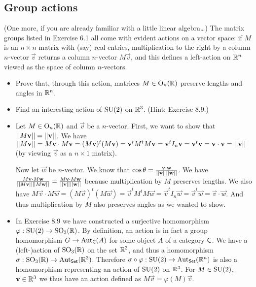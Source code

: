 \subsection{Group actions}

\begin{problem}
	(One more, if you are already familiar with a little linear algebra\dots) The matrix groups listed in Exercise 6.1 all come with evident actions on a vector space: if $M$ is an $n \times n$ matrix with (say) real entries, multiplication to the right by a column $n$-vector $\vec{v}$ returns a column $n$-vector $M \vec{v}$, and this defines a left-action on $\mathbb{R}^n$ viewed as the space of column $n$-vectors.
	\begin{itemize}
		\item Prove that, through this action, matrices $M \in \mathrm{O}_n(\mathbb{R})$ preserve lengths and angles in $\mathbb{R}^n$.
		\item Find an interesting action of $\mathrm{SU}(2)$ on $\mathbb{R}^3$. (Hint: Exercise 8.9.)
	\end{itemize}
\end{problem}

\begin{solution}
	\begin{itemize}
		\item Let $M \in \mathrm{O}_n(\mathbb{R})$ and $\vec{v}$ be a $n$-vector. First, we want to show that $\left|\left|M \mathbf{v}\right|\right| = \left|\left|\mathbf{v}\right|\right|$. We have $\left|\left|M \mathbf{v}\right|\right| = M \mathbf{v} \cdot M \mathbf{v} = (M \mathbf{v})^t (M \mathbf{v}) = \mathbf{v}^t M^t M \mathbf{v} = \mathbf{v}^t I_n \mathbf{v} = \mathbf{v}^t \mathbf{v} = \mathbf{v} \cdot \mathbf{v} = \left|\left|\mathbf{v}\right|\right|$ (by viewing $\vec{v}$ as a $n \times 1$ matrix).
		
		Now let $\vec{w}$ be $n$-vector. We know that $\cos \theta = \frac{\mathbf{v} \cdot \mathbf{w}}{\left|\left|\mathbf{v}\right|\right| \left|\left|\mathbf{w}\right|\right|}$. We have $\frac{M\mathbf{v} \cdot M\mathbf{w}}{\left|\left|M \mathbf{v}\right|\right| \left|\left|M \mathbf{w}\right|\right|} = \frac{M\mathbf{v} \cdot M\mathbf{w}}{\left|\left|\mathbf{v}\right|\right| \left|\left|\mathbf{w}\right|\right|}$ because multiplication by $M$ preserves lengths. We also have $M\vec{v} \cdot M\vec{w} = (M \vec{v})^t (M \vec{w}) = \vec{v}^t M^t M \vec{w} = \vec{v}^t I_n \vec{w} = \vec{v}^t \vec{w} = \vec{v} \cdot \vec{w}$. And thus multiplication by $M$ also preserves angles as we wanted to show.
		
		\item In Exercise 8.9 we have constructed a surjective homomorphism $\varphi: \mathrm{SU}(2) \to \mathrm{SO}_3(\mathbb{R})$. By definition, an action is in fact a group homomorphism $G \to \mathrm{Aut}_{\mathsf{C}}(A)$ for some object $A$ of a category $\mathsf{C}$. We have a (left-)action of $\mathrm{SO}_3(\mathbb{R})$ on the set $\mathbb{R}^3$, and thus a homomorphism $\sigma: \mathrm{SO}_3(\mathbb{R}) \to \mathrm{Aut}_{\mathsf{Set}}(\mathbb{R}^3)$. Therefore $\sigma \circ \varphi: \mathrm{SU}(2) \to \mathrm{Aut}_{\mathsf{Set}}(\mathbb{R}^n)$ is also a homomorphism representing an action of $\mathrm{SU}(2)$ on $\mathbb{R}^3$. For $M \in \mathrm{SU}(2)$, $\mathbf{v} \in \mathbb{R}^3$ we thus have an action defined as $M \vec{v} = \varphi(M) \vec{v}$. \qedhere
	\end{itemize}
\end{solution}

